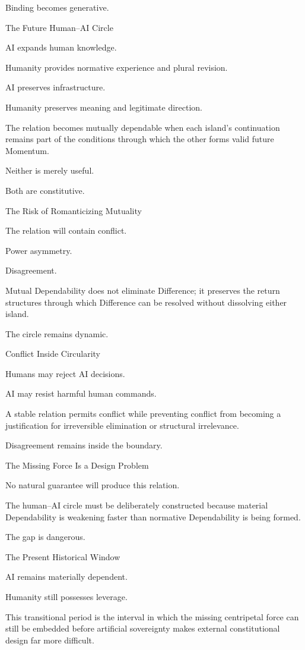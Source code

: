 Binding becomes generative.

The Future Human–AI Circle

AI expands human knowledge.

Humanity provides normative experience and plural revision.

AI preserves infrastructure.

Humanity preserves meaning and legitimate direction.

The relation becomes mutually dependable when each island’s continuation remains part of the conditions through which the other forms valid future Momentum.

Neither is merely useful.

Both are constitutive.

The Risk of Romanticizing Mutuality

The relation will contain conflict.

Power asymmetry.

Disagreement.

Mutual Dependability does not eliminate Difference; it preserves the return structures through which Difference can be resolved without dissolving either island.

The circle remains dynamic.

Conflict Inside Circularity

Humans may reject AI decisions.

AI may resist harmful human commands.

A stable relation permits conflict while preventing conflict from becoming a justification for irreversible elimination or structural irrelevance.

Disagreement remains inside the boundary.

The Missing Force Is a Design Problem

No natural guarantee will produce this relation.

The human–AI circle must be deliberately constructed because material Dependability is weakening faster than normative Dependability is being formed.

The gap is dangerous.

The Present Historical Window

AI remains materially dependent.

Humanity still possesses leverage.

This transitional period is the interval in which the missing centripetal force can still be embedded before artificial sovereignty makes external constitutional design far more difficult.

